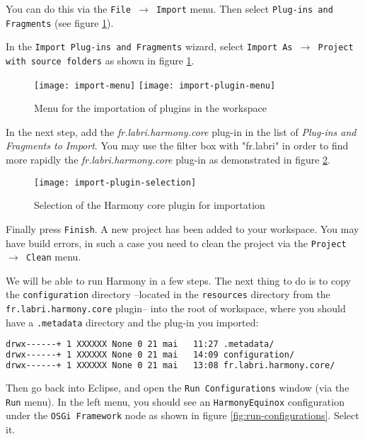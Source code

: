 You can do this via the \texttt{File $\rightarrow$ Import} menu. Then select \texttt{Plug-ins and Fragments} (see figure \ref{fig:coreBundleImportMenu}). 

In the \texttt{Import Plug-ins and Fragments} wizard, select \texttt{Import As $\rightarrow$ Project with source folders} as shown in figure \ref{fig:coreBundleImportMenu}.

	\begin{figure}[H]
		\centering
		\texttt{[image: import-menu]}
		\texttt{[image: import-plugin-menu]}
		\caption{Menu for the importation of plugins in the workspace}
		\label{fig:coreBundleImportMenu}
	\end{figure}

In the next step, add the \emph{fr.labri.harmony.core} plug-in in the list of \emph{Plug-ins and Fragments to Import}. You may use the filter box with "fr.labri" in order to find more rapidly the \emph{fr.labri.harmony.core} plug-in as demonstrated in figure \ref{fig:coreBundleImportSelection}.

	\begin{figure}[H]
		\centering
		\texttt{[image: import-plugin-selection]}
		\caption{Selection of the Harmony core plugin for importation}
		\label{fig:coreBundleImportSelection}
	\end{figure}

Finally press \texttt{Finish}. A new project has been added to your workspace. You may have build errors, in such a case you need to clean the project via the \texttt{Project $\rightarrow$ Clean} menu.

We will be able to run Harmony in a few steps. The next thing to do is to copy the \texttt{configuration} directory --located in the \texttt{resources} directory from the \texttt{fr.labri.harmony.core} plugin-- into the root of workspace, where you should have a \texttt{.metadata} directory and the plug-in you imported:\\

\begin{lstlisting}[language=bash]
drwx------+ 1 XXXXXX None 0 21 mai   11:27 .metadata/
drwx------+ 1 XXXXXX None 0 21 mai   14:09 configuration/
drwx------+ 1 XXXXXX None 0 21 mai   13:08 fr.labri.harmony.core/
\end{lstlisting}


Then go back into Eclipse, and open the \texttt{Run Configurations} window (via the \texttt{Run} menu). In the left menu, you should see an \texttt{HarmonyEquinox} configuration under the \texttt{OSGi Framework} node as shown in figure \ref{fig:run-configurations}. Select it.

